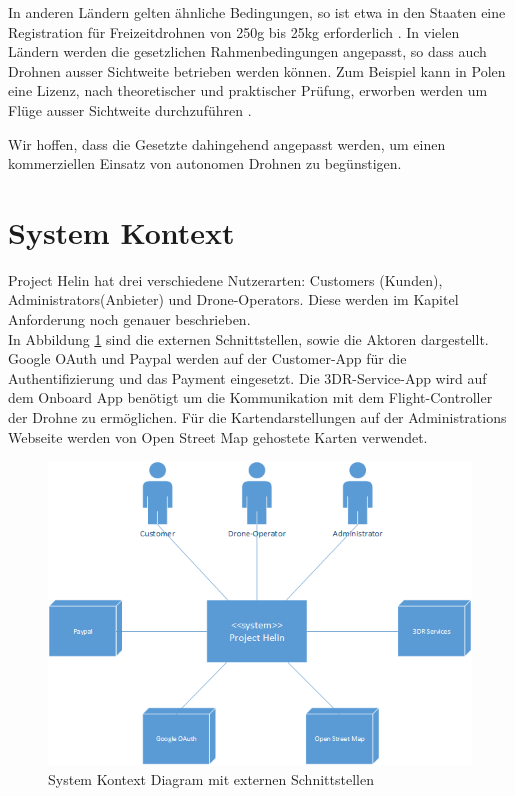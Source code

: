 In anderen Ländern gelten ähnliche Bedingungen, so ist etwa in den Staaten eine Registration für Freizeitdrohnen von 250g bis 25kg erforderlich \cite[Seite 26]{pwc-drone}.
In vielen Ländern werden die gesetzlichen Rahmenbedingungen angepasst, so dass auch Drohnen ausser Sichtweite betrieben werden können.
Zum Beispiel kann in Polen eine Lizenz, nach theoretischer und praktischer Prüfung, erworben werden um Flüge ausser Sichtweite durchzuführen \cite[Seite 21]{pwc-drone}.

Wir hoffen, dass die Gesetzte dahingehend angepasst werden, um einen kommerziellen Einsatz von autonomen Drohnen zu begünstigen. 

\section{System Kontext}

Project Helin hat drei verschiedene Nutzerarten: Customers (Kunden), Administrators(Anbieter) und Drone-Operators. Diese werden im Kapitel Anforderung noch genauer beschrieben.\\

In Abbildung \ref{fig:system-context-diagram} sind die externen Schnittstellen, sowie die Aktoren dargestellt. Google OAuth und Paypal werden auf der Customer-App für die Authentifizierung und das Payment eingesetzt. Die 3DR-Service-App wird auf dem Onboard App benötigt um die Kommunikation mit dem Flight-Controller der Drohne zu ermöglichen. Für die Kartendarstellungen auf der Administrations Webseite werden von Open Street Map gehostete Karten verwendet.


\begin{figure}[h]
\includegraphics[width=1.0\textwidth]{images/system-context-diagram.png}
\caption{System Kontext Diagram mit externen Schnittstellen }
\label{fig:system-context-diagram}
\end{figure}









